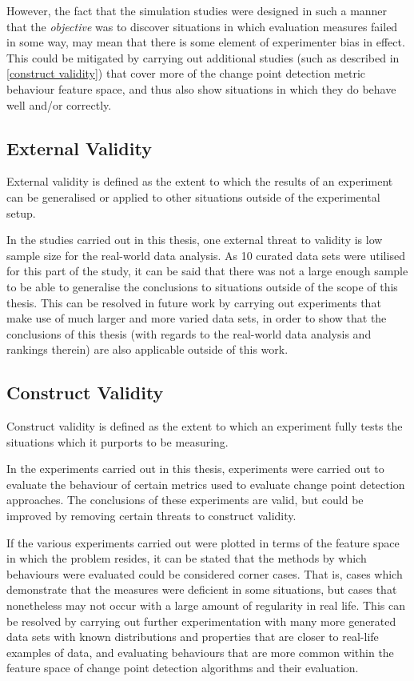 \documentclass[../main.tex]{subfiles}
\begin{document}
However, the fact that the simulation studies were designed in such a manner that the \emph{objective} was to discover situations in which evaluation measures failed in some way, may mean that there is some element of experimenter bias in effect. This could be mitigated by carrying out additional studies (such as described in \autoref{construct validity}) that cover more of the change point detection metric behaviour feature space, and thus also show situations in which they do behave well and/or correctly.

\subsection{External Validity}

External validity is defined as the extent to which the results of an experiment can be generalised or applied to other situations outside of the experimental setup.

In the studies carried out in this thesis, one external threat to validity is low sample size for the real-world data analysis. As 10 curated data sets were utilised for this part of the study, it can be said that there was not a large enough sample to be able to generalise the conclusions to situations outside of the scope of this thesis. This can be resolved in future work by carrying out experiments that make use of much larger and more varied data sets, in order to show that the conclusions of this thesis (with regards to the real-world data analysis and rankings therein) are also applicable outside of this work.

\subsection{Construct Validity}
\label{construct validity}

Construct validity is defined as the extent to which an experiment fully tests the situations which it purports to be measuring.

In the experiments carried out in this thesis, experiments were carried out to evaluate the behaviour of certain metrics used to evaluate change point detection approaches. The conclusions of these experiments are valid, but could be improved by removing certain threats to construct validity.

If the various experiments carried out were plotted in terms of the feature space in which the problem resides, it can be stated that the methods by which behaviours were evaluated could be considered corner cases. That is, cases which demonstrate that the measures were deficient in some situations, but cases that nonetheless may not occur with a large amount of regularity in real life. This can be resolved by carrying out further experimentation with many more generated data sets with known distributions and properties that are closer to real-life examples of data, and evaluating behaviours that are more common within the feature space of change point detection algorithms and their evaluation.
\end{document}
